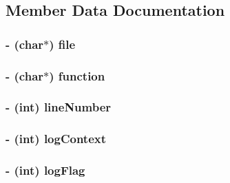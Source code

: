 \subsection{Member Data Documentation}
\hypertarget{interface_d_d_log_message_afa29219e2ccb7ca1eefcef23c7743666}{
\subsubsection[{file}]{\setlength{\rightskip}{0pt plus 5cm}-\/ (char$\ast$) file}}\label{interface_d_d_log_message_afa29219e2ccb7ca1eefcef23c7743666}
\hypertarget{interface_d_d_log_message_a06aa077ba446916d291c2ad2a957b911}{
\subsubsection[{function}]{\setlength{\rightskip}{0pt plus 5cm}-\/ (char$\ast$) function}}\label{interface_d_d_log_message_a06aa077ba446916d291c2ad2a957b911}
\hypertarget{interface_d_d_log_message_a0c059538008557787ae00d93baeb4a41}{
\subsubsection[{line\-Number}]{\setlength{\rightskip}{0pt plus 5cm}-\/ (int) line\-Number}}\label{interface_d_d_log_message_a0c059538008557787ae00d93baeb4a41}
\hypertarget{interface_d_d_log_message_a73dcbc9ddf49e9d958c3b29ec3810375}{
\subsubsection[{log\-Context}]{\setlength{\rightskip}{0pt plus 5cm}-\/ (int) log\-Context}}\label{interface_d_d_log_message_a73dcbc9ddf49e9d958c3b29ec3810375}
\hypertarget{interface_d_d_log_message_a92ea97658b57ae4149935acebeab7a24}{
\subsubsection[{log\-Flag}]{\setlength{\rightskip}{0pt plus 5cm}-\/ (int) log\-Flag}}\label{interface_d_d_log_message_a92ea97658b57ae4149935acebeab7a24}
